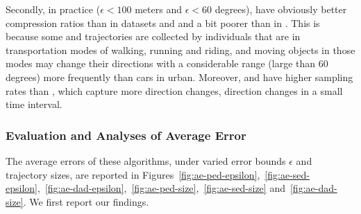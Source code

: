 Secondly, in practice (\eg $\epsilon <100$ meters and $\epsilon < 60$ degrees), \sed have obviously better compression ratios than \dad in datasets \geolife and \mopsi and a bit poorer than \dad in \ucar.
This is because some \geolife and \mopsi trajectories are collected by individuals that are in transportation modes of walking, running and riding, and moving objects in those modes may change their directions with a considerable range (\eg large than $60$ degrees) more frequently than cars in urban. Moreover, \geolife and \mopsi have higher sampling rates than \ucar, which capture more direction changes, \ie direction changes in a small time interval.








\subsubsection{Evaluation and Analyses of Average Error}
\label{sec-ae}
The average errors of these algorithms, under varied error bounds $\epsilon$ and trajectory sizes, are reported in Figures~\ref{fig:ae-ped-epsilon},~\ref{fig:ae-sed-epsilon},~\ref{fig:ae-dad-epsilon},~\ref{fig:ae-ped-size},~\ref{fig:ae-sed-size} and~\ref{fig:ae-dad-size}.
We first report our findings.





